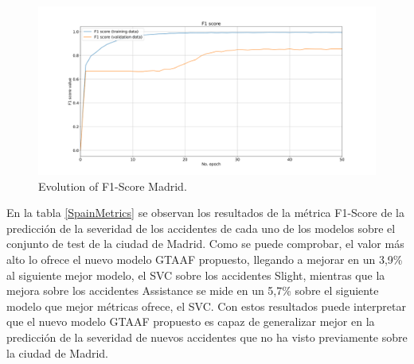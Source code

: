 \documentclass{uathesis-es}
\begin{document}
\begin{figure}[H]
\centering
    \includegraphics[width=160mm]{Figures/Madrid/madrid_convolution_2d_f1_score_2023-12-03-12 54 29.png}
    \caption{Evolution of F1-Score Madrid.}
\label{MadridLossFunction}
\end{figure}

En la tabla \ref{SpainMetrics} se observan los resultados de la métrica F1-Score de la predicción de la severidad de los accidentes de cada uno de los modelos sobre el conjunto de test de la ciudad de Madrid. Como se puede comprobar, el valor más alto lo ofrece el nuevo modelo GTAAF propuesto, llegando a mejorar en un 3,9\% al siguiente mejor modelo, el SVC sobre los accidentes Slight, mientras que la mejora sobre los accidentes Assistance se mide en un 5,7\% sobre el siguiente modelo que mejor métricas ofrece, el SVC. Con estos resultados puede interpretar que el nuevo modelo GTAAF propuesto es capaz de generalizar mejor en la predicción de la severidad de nuevos accidentes que no ha visto previamente sobre la ciudad de Madrid.
\end{document}
